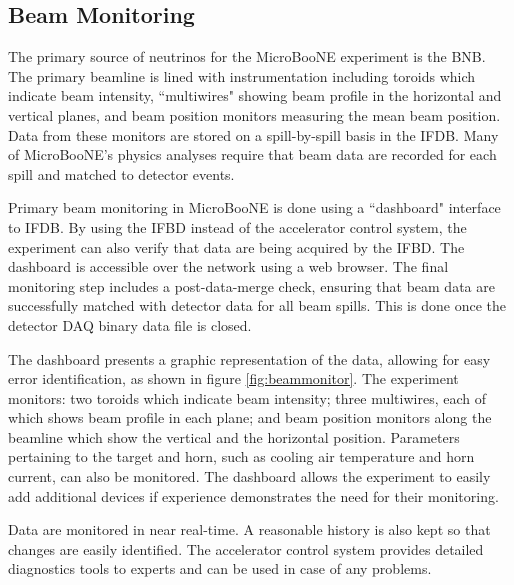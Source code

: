 \subsection{Beam Monitoring}
\label{sec:beam-monitoring}

The primary source of neutrinos for the MicroBooNE experiment is the BNB. The primary beamline is lined with instrumentation including toroids which indicate beam intensity, ``multiwires" showing beam profile in the horizontal and vertical planes, and beam position monitors measuring the mean beam position. Data from these monitors are stored on a spill-by-spill basis in the IFDB. Many of MicroBooNE's physics analyses require that beam data are recorded for each spill and matched to detector events.

Primary beam monitoring in MicroBooNE is done using a ``dashboard" interface to IFDB. By using the IFBD instead of the accelerator control system, the experiment can also verify that data are being acquired by the IFBD. The dashboard is accessible over the network using a web browser. The final monitoring step includes a post-data-merge check, ensuring that beam data are successfully matched with detector data for all beam spills. This is done once the detector DAQ binary data file is closed. 

The dashboard presents a graphic representation of the data, allowing for easy error identification, as shown in figure \ref{fig:beammonitor}.  The experiment monitors: two toroids which indicate beam intensity; three multiwires, each of which shows beam profile in each plane; and beam position monitors along the beamline which show the vertical and the horizontal position.  Parameters pertaining to the target and horn, such as cooling air temperature and horn current, can also be monitored.  The dashboard allows the experiment to easily add additional devices if experience demonstrates the need for their monitoring.

Data are monitored in near real-time.  A reasonable history is also kept so that changes are easily identified.  The accelerator control system provides detailed diagnostics tools to experts and can be used in case of any problems.



